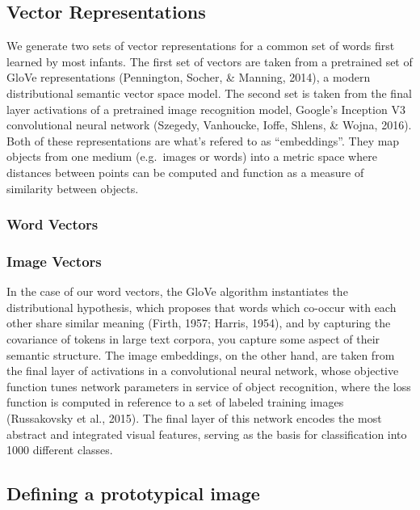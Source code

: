 \documentclass[10pt, letterpaper]{article}
\begin{document}
\subsection{Vector Representations}\label{vector-representations}

We generate two sets of vector representations for a common set of words
first learned by most infants. The first set of vectors are taken from a
pretrained set of GloVe representations (Pennington, Socher, \& Manning,
2014), a modern distributional semantic vector space model. The second
set is taken from the final layer activations of a pretrained image
recognition model, Google's Inception V3 convolutional neural network
(Szegedy, Vanhoucke, Ioffe, Shlens, \& Wojna, 2016). Both of these
representations are what's refered to as ``embeddings''. They map
objects from one medium (e.g.~images or words) into a metric space where
distances between points can be computed and function as a measure of
similarity between objects.

\subsubsection{Word Vectors}\label{word-vectors}

\subsubsection{Image Vectors}\label{image-vectors}

In the case of our word vectors, the GloVe algorithm instantiates the
distributional hypothesis, which proposes that words which co-occur with
each other share similar meaning (Firth, 1957; Harris, 1954), and by
capturing the covariance of tokens in large text corpora, you capture
some aspect of their semantic structure. The image embeddings, on the
other hand, are taken from the final layer of activations in a
convolutional neural network, whose objective function tunes network
parameters in service of object recognition, where the loss function is
computed in reference to a set of labeled training images (Russakovsky
et al., 2015). The final layer of this network encodes the most abstract
and integrated visual features, serving as the basis for classification
into 1000 different classes.

\subsection{Defining a prototypical
image}\label{defining-a-prototypical-image}
\end{document}
